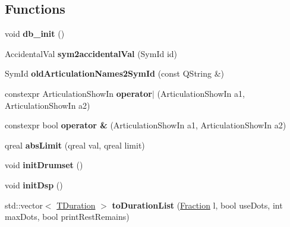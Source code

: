 \subsection*{Functions}
\begin{DoxyCompactItemize}
\item 
\mbox{\label{namespace_ms_af525b8e142c44653bacf644c7098cf61}} 
void {\bfseries db\+\_\+init} ()
\item 
\mbox{\label{namespace_ms_a6e4de0d30e56df6fa411ff47872638cf}} 
Accidental\+Val {\bfseries sym2accidental\+Val} (Sym\+Id id)
\item 
\mbox{\label{namespace_ms_a87b5946c510fbae2ba203f030d31da87}} 
Sym\+Id {\bfseries old\+Articulation\+Names2\+Sym\+Id} (const Q\+String \&)
\item 
\mbox{\label{namespace_ms_a75ba7c9950b5e6dc67b6d0134a9215a2}} 
constexpr Articulation\+Show\+In {\bfseries operator$\vert$} (Articulation\+Show\+In a1, Articulation\+Show\+In a2)
\item 
\mbox{\label{namespace_ms_a52544faf6df5e4a9ddcc5aa2d8b51c0f}} 
constexpr bool {\bfseries operator \&} (Articulation\+Show\+In a1, Articulation\+Show\+In a2)
\item 
\mbox{\label{namespace_ms_a9044c630dd2db3b280dd0647d2adb21b}} 
qreal {\bfseries abs\+Limit} (qreal val, qreal limit)
\item 
\mbox{\label{namespace_ms_aea154039153d807a2ed7945cb35bf5bd}} 
void {\bfseries init\+Drumset} ()
\item 
\mbox{\label{namespace_ms_abd02c7ff0a97d9167ad3174daee23248}} 
void {\bfseries init\+Dsp} ()
\item 
\mbox{\label{namespace_ms_a2b067d41bac5aceb3682836a79939376}} 
std\+::vector$<$ \hyperlink{class_ms_1_1_t_duration}{T\+Duration} $>$ {\bfseries to\+Duration\+List} (\hyperlink{class_ms_1_1_fraction}{Fraction} l, bool use\+Dots, int max\+Dots, bool print\+Rest\+Remains)
\item 
\mbox{\label{namespace_ms_a9d4ce6469e42bbfeed9d8f5bc314dbd3}} 

\end{DoxyCompactItemize}
